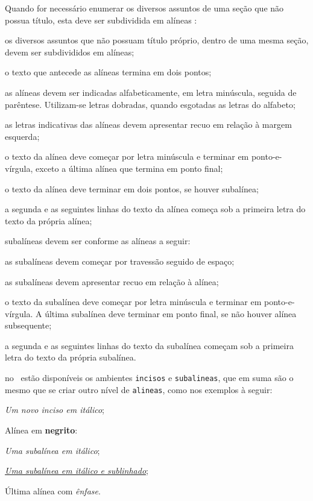 \documentclass[12pt,oneside,a4paper,chapter=TITLE,english,brazil]{abntex2}
\begin{document}
\begin{anexosenv}
Quando for necessário enumerar os diversos assuntos de uma seção que não possua título, esta deve ser subdividida em alíneas \cite[4.2]{NBR6024:2012}:
\begin{alineas}
  \item os diversos assuntos que não possuam título próprio, dentro de uma mesma seção, devem ser subdivididos em alíneas; 
  \item o texto que antecede as alíneas termina em dois pontos;
  \item as alíneas devem ser indicadas alfabeticamente, em letra minúscula, seguida de parêntese. Utilizam-se letras dobradas, quando esgotadas as letras do alfabeto;
  \item as letras indicativas das alíneas devem apresentar recuo em relação à margem esquerda;
  \item o texto da alínea deve começar por letra minúscula e terminar em   ponto-e-vírgula, exceto a última alínea que termina em ponto final;
  \item o texto da alínea deve terminar em dois pontos, se houver subalínea;
  \item a segunda e as seguintes linhas do texto da alínea começa sob a primeira letra do texto da própria alínea;
  \item subalíneas \cite[4.3]{NBR6024:2012} devem ser conforme as alíneas a seguir:
  \begin{alineas}
     \item as subalíneas devem começar por travessão seguido de espaço;
     \item as subalíneas devem apresentar recuo em relação à alínea;
     \item o texto da subalínea deve começar por letra minúscula e terminar em ponto-e-vírgula. A última subalínea deve terminar em ponto final, se não houver alínea subsequente;
     \item a segunda e as seguintes linhas do texto da subalínea começam sob a primeira letra do texto da própria subalínea.
  \end{alineas}
  \item no \abnTeX\ estão disponíveis os ambientes \texttt{incisos} e   \texttt{subalineas}, que em suma são o mesmo que se criar outro nível de \texttt{alineas}, como nos exemplos à seguir:
  \begin{incisos}
    \item \textit{Um novo inciso em itálico};
  \end{incisos}
  \item Alínea em \textbf{negrito}:
  \begin{subalineas}
    \item \textit{Uma subalínea em itálico};
    \item \underline{\textit{Uma subalínea em itálico e sublinhado}}; 
  \end{subalineas}
  \item Última alínea com \emph{ênfase}.
\end{alineas}


\end{anexosenv}
\end{document}

